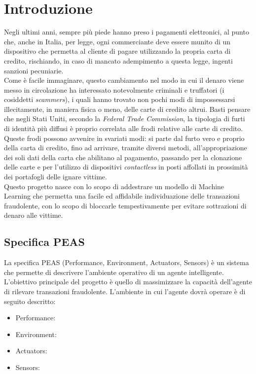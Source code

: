 \documentclass[]{article}
\begin{document}
\section{Introduzione}
    Negli ultimi anni, sempre più piede hanno preso i pagamenti elettronici, al punto che, anche in Italia, per legge, ogni commerciante deve essere munito di un dispositivo che permetta al cliente di pagare utilizzando la propria carta di credito, rischiando, in caso di mancato adempimento a questa legge, ingenti sanzioni pecuniarie.\\
    Come è facile immaginare, questo cambiamento nel modo in cui il denaro viene messo in circolazione ha interessato notevolmente criminali e truffatori (i cosiddetti \textit{scammers}), i quali hanno trovato non pochi modi di impossessarsi illecitamente, in maniera fisica o meno, delle carte di credito altrui.
    Basti pensare che negli Stati Uniti, secondo la \textit{Federal Trade Commission}, la tipologia di furti di identità più diffusi è proprio correlata alle frodi relative alle carte di credito.\\
    Queste frodi possono avvenire in svariati modi: si parte dal furto vero e proprio della carta di credito, fino ad arrivare, tramite diversi metodi, all'appropriazione dei soli dati della carta che abilitano al pagamento, passando per la clonazione delle carte e per l'utilizzo di dispositivi \textit{contactless} in posti affollati in prossimità dei portafogli delle ignare vittime.\\
    Questo progetto nasce con lo scopo di addestrare un modello di Machine Learning che permetta una facile ed affidabile individuazione delle transazioni fraudolente, con lo scopo di bloccarle tempestivamente per evitare sottrazioni di denaro alle vittime.

    \subsection{Specifica PEAS}
        La specifica PEAS (Performance, Environment, Actuators, Sensors) è un sistema che permette di descrivere l'ambiente operativo di un agente intelligente. L'obiettivo principale del progetto è quello di massimizzare la capacità dell'agente di rilevare transazioni fraudolente. L'ambiente in cui l'agente dovrà operare è di seguito descritto:
        \begin{itemize}
            \item Performance:
            \item Environment:
            \item Actuators:
            \item Sensors:
        \end{itemize}
\end{document}
